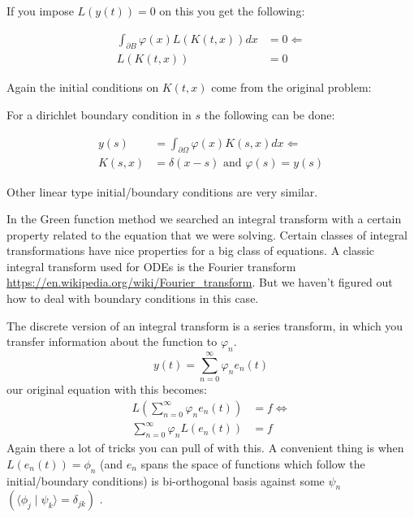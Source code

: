 \documentclass[a4paper,12pt]{article}
\begin{document}
If you impose $L(y(t)) = 0$ on this you get the following:

\begin{align*}
    \int_{\partial B} \varphi(x) L(K(t,x)) dx & = 0 \Leftarrow \\
    L(K(t,x))                                 & = 0
\end{align*}

Again the initial conditions on $K(t,x)$ come from the original problem:

For a dirichlet boundary condition in $s$ the following can be done:

\begin{align*}
    y(s)   & = \int_{\partial \Omega} \varphi(x) K(s,x)dx \Leftarrow \\
    K(s,x) & = \delta(x-s) \text{ and } \varphi(s)= y(s)
\end{align*}

Other linear type initial/boundary conditions are very similar.

In the Green function method we searched an integral transform with a certain property
related to the equation that we were solving. Certain classes of integral
transformations have nice properties for a big class of equations.
A classic integral transform used for ODEs is the Fourier transform
\url{https://en.wikipedia.org/wiki/Fourier_transform}.
But we haven't figured
out how to deal with boundary conditions in this case.

The discrete version of an integral transform is a series transform,
in which you transfer information about the function to $\varphi_n$.
$$
    y(t) = \sum_{n=0}^{\infty} \varphi_n e_n(t)
$$
our original equation with this becomes:
\begin{align*}
    L \left(\sum_{n=0}^{\infty} \varphi_n e_n(t) \right) & = f \Leftrightarrow \\
    \sum_{n=0}^{\infty} \varphi_n L (e_n(t))             & = f
\end{align*}
Again there a lot of tricks you can pull of with this.
A convenient thing is when $L(e_{n}(t)) = \phi_{n}$ (and $e_{n}$
spans the space of functions which follow the initial/boundary conditions)
is bi-orthogonal basis against some $\psi_n$
$\left(\langle \phi_j \mid \psi_{k} \rangle= \delta_{jk}\right)$ .
\end{document}
